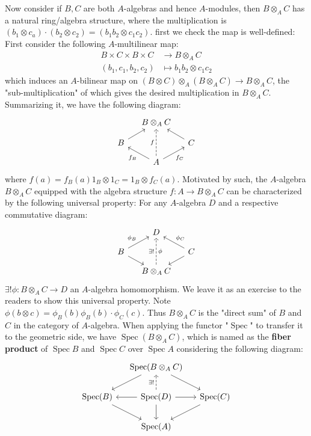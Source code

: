 \documentclass[12pt]{article}
\theoremstyle{definition}
\theoremstyle{plain}
\DeclareMathOperator{\Spec}{Spec}
\begin{document}
\medskip
Now consider if $B, C$ are both $A$-algebras and hence $A$-modules, then $B\otimes_A C$ has a natural ring/algebra structure, where the multiplication is $(b_1\otimes c_a)\cdot (b_2\otimes c_2)=(b_1b_2\otimes c_1c_2)$. first we check the map is well-defined: First consider the following $A$-multilinear map:
\begin{align*}
  B\times C\times B\times C&\to B\otimes_A C\\
  (b_1, c_1, b_2, c_2)&\mapsto b_1b_2\otimes c_1c_2
\end{align*}
which induces an $A$-bilinear map on $(B\otimes C)\otimes_A (B\otimes_A C)\to B\otimes_A C$, the "sub-multiplication" of which gives the desired multiplication in $B\otimes_A C$. Summarizing it, we have the following diagram:
\begin{equation}
  \begin{tikzcd}[row sep=small, column sep=small]
    &B\otimes_A C\\
    B\ar{ru} & &C\ar{lu}\\
    &A\ar{lu}{f_B}\ar[dashed]{uu}{f} \ar{ru}[swap]{f_C}
  \end{tikzcd}
\end{equation}
where $f(a)=f_B(a)1_B\otimes 1_C=1_B\otimes f_C(a)$. Motivated by such, the $A$-algebra $B\otimes_A C$ equipped with the algebra structure $f:A\to B\otimes_A C$ can be characterized by the following universal property:
\Prop For any $A$-algebra $D$ and a respective commutative diagram:
\begin{equation}
  \begin{tikzcd}[row sep=small, column sep=small]
    &D\\
    B\ar{rd}\ar{ru}{\phi_B} & &C\ar{ld}\ar{lu}[swap]{\phi_C}\\
    &B\otimes_A C\ar[dashed]{uu}{\exists !}[swap]{\phi}
  \end{tikzcd}
\end{equation}
$\exists ! \phi: B\otimes_AC\to D$ an $A$-algebra homomorphism.
\proof We leave it as an exercise to the readers to show this universal property. Note $\phi(b\otimes c)=\phi_B(b)\phi_B(b)\cdot \phi_C(c)$.
\Rmk Thus $B\otimes_A C$ is the "direct sum" of $B$ and $C$ in the category of $A$-algebra. When applying the functor "$\Spec$" to transfer it to the geometric side, we have $\Spec(B\otimes_A C)$, which is named as the \textbf{fiber product} of $\Spec B$ and $\Spec C$ over $\Spec A$ considering the following diagram:
\begin{equation}
  \begin{tikzcd}[column sep=small]
    &\Spec(B\otimes_A C)\ar{rd}\ar{ld}\\
    \Spec(B)\ar{rd}&\Spec(D)\ar[dashed]{u}{\exists !}\ar{r}\ar{l}\ar{d} &\Spec(C)\ar{ld}\\
    &\Spec(A)
  \end{tikzcd}
\end{equation}
\end{document}
